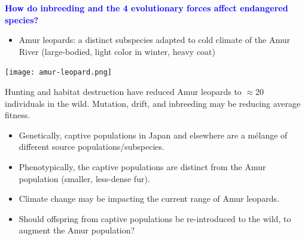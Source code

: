 \begin{frame}[t]
    \begin{adjustwidth}{-1.5em}{-1.5em}
        \vspace{-3mm}
        \textcolor{blue}{\bf How do inbreeding and the 4 evolutionary forces
            affect endangered species?}

        \begin{itemize}
            \item Amur leopards: a distinct subspecies adapted to cold climate
                of the Amur River (large-bodied, light color in winter, heavy
                coat)
        \end{itemize}
        \begin{center}
            \texttt{[image: amur-leopard.png]}
        \end{center}
    \end{adjustwidth}
\end{frame}

\begin{frame}[t]
    \begin{adjustwidth}{-1.5em}{-1.5em}
        Hunting and habitat destruction have reduced Amur leopards to
        $\approx$20 individuals in the wild. Mutation, drift, and inbreeding
        may be reducing average fitness. 

        \begin{itemize}
            \item<2-> Genetically, captive populations in Japan and elsewhere
                are a m\'{e}lange of different source populations/subspecies. 
            \item<3-> Phenotypically, the captive populations are distinct from
                the Amur population (smaller, less-dense fur).
            \item<4-> Climate change may be impacting the current range of Amur
                leopards.
            \item<5-> Should offspring from captive populations be
                re-introduced to the wild, to augment the Amur population? 
        \end{itemize}
    \end{adjustwidth}
\end{frame}

